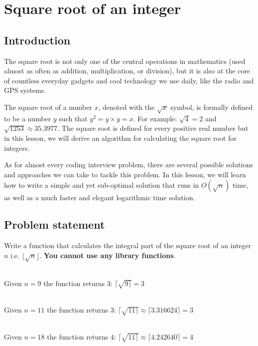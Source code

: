 %


\chapter{Square root of an integer}
\label{ch:square_root}
\section*{Introduction}

The square root is not only one of the central operations in mathematics (used almost as often as addition, multiplication, or division), but it is also at the core of countless everyday gadgets and cool technology we use daily, like the radio and GPS systems.

The square root of a number $x$, denoted with the $\sqrt{x}$ symbol, is formally defined to be a number $y$ such that $y^2 = y\times y=x$.
For example: $\sqrt{4} = 2$ and $\sqrt{1253} \approx 35.3977$.
The square root is defined for every positive real number but in this lesson, we will derive an algorithm for calculating the square root for integers.

As for almost every coding interview problem, there are several possible solutions and approaches we can take to tackle this problem. 
In this lesson, we will learn how to write a simple and yet sub-optimal solution that runs in $O(\sqrt{n})$ time,
as well as a much faster and elegant logarithmic time solution.


\section{Problem statement}
	\begin{exercise}
		Write a function that calculates the integral part of the square root of an integer $n$ i.e. $\lfloor \sqrt{n}\rfloor$.
		\textbf{You cannot use any library functions}.


	\begin{example}
	\hfill \\
	Given $n=9$ the function returns $3$: $\lceil\sqrt{9 \rceil}=3$
	\end{example}

	\begin{example}
		\hfill \\
		Given $n=11$ the function returns $3$: $\lceil\sqrt{11 \rceil}\approx\lceil3.316624 \rceil=3$
	\end{example}

	\begin{example}
		\hfill \\
		Given $n=18$ the function returns $4$: $\lceil\sqrt{11 \rceil}\approx\lceil4.242640 \rceil=4$
	\end{example}
	
\end{exercise}

